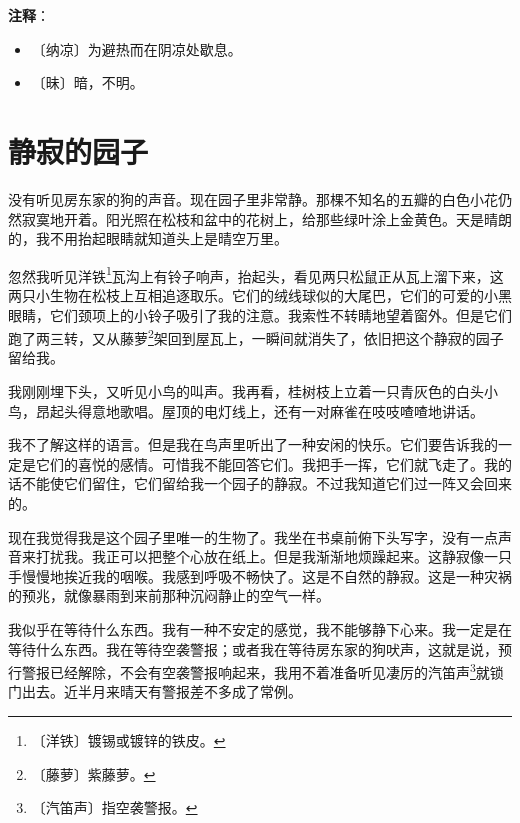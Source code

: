 \documentclass[12pt,UTF-8,openany]{ctexbook}
\begin{document}
\newpage

\textbf{注释}：

\vspace{-1em}

\begin{itemize}
    \setlength\itemsep{-0.2em}
    \item 〔纳凉〕为避热而在阴凉处歇息。
    \item 〔昧〕暗，不明。
\end{itemize}

\chapter{静寂的园子}

\begin{large}
    
    没有听见房东家的狗的声音。现在园子里非常静。那棵不知名的五瓣的白色小花仍然寂寞地开着。阳光照在松枝和盆中的花树上，给那些绿叶涂上金黄色。天是晴朗的，我不用抬起眼睛就知道头上是晴空万里。
    
    忽然我听见洋铁\footnote{〔洋铁〕镀锡或镀锌的铁皮。}瓦沟上有铃子响声，抬起头，看见两只松鼠正从瓦上溜下来，这两只小生物在松枝上互相追逐取乐。它们的绒线球似的大尾巴，它们的可爱的小黑眼睛，它们颈项上的小铃子吸引了我的注意。我索性不转睛地望着窗外。但是它们跑了两三转，又从藤萝\footnote{〔藤萝〕紫藤萝。}架回到屋瓦上，一瞬间就消失了，依旧把这个静寂的园子留给我。
    
    我刚刚埋下头，又听见小鸟的叫声。我再看，桂树枝上立着一只青灰色的白头小鸟，昂起头得意地歌唱。屋顶的电灯线上，还有一对麻雀在吱吱喳喳地讲话。
    
    我不了解这样的语言。但是我在鸟声里听出了一种安闲的快乐。它们要告诉我的一定是它们的喜悦的感情。可惜我不能回答它们。我把手一挥，它们就飞走了。我的话不能使它们留住，它们留给我一个园子的静寂。不过我知道它们过一阵又会回来的。
    
    现在我觉得我是这个园子里唯一的生物了。我坐在书桌前俯下头写字，没有一点声音来打扰我。我正可以把整个心放在纸上。但是我渐渐地烦躁起来。这静寂像一只手慢慢地挨近我的咽喉。我感到呼吸不畅快了。这是不自然的静寂。这是一种灾祸的预兆，就像暴雨到来前那种沉闷静止的空气一样。
    
    我似乎在等待什么东西。我有一种不安定的感觉，我不能够静下心来。我一定是在等待什么东西。我在等待空袭警报；或者我在等待房东家的狗吠声，这就是说，预行警报已经解除，不会有空袭警报响起来，我用不着准备听见凄厉的汽笛声\footnote{〔汽笛声〕指空袭警报。}就锁门出去。近半月来晴天有警报差不多成了常例。
    

\end{large}
\end{document}

